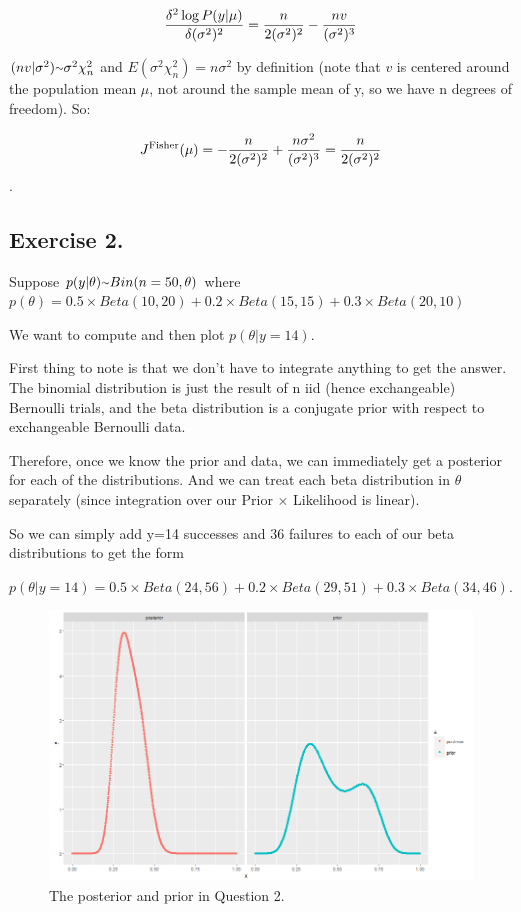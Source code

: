 \documentclass{article}
\newcommand{\mytilde}{\raise.17ex\hbox{$\scriptstyle\mathtt{\sim}$}}
\begin{document}
\[{\delta^2\log P(y\vert\mu) \over \delta(\sigma^2)^2} =  {n \over 2(\sigma^2)^2} - {nv \over (\sigma^2)^3}\]

\((nv \vert \sigma^2) \mytilde \sigma^2\chi^2_{n} \) and \(E( \sigma^2\chi^2_{n}) = n\sigma^2\) by definition (note that 
\(v\) is centered around the population mean \(\mu\), not around the sample mean of y, so we have n degrees of freedom). So:

\[J^{\text{Fisher}}(\mu) = 
-{n \over 2(\sigma^2)^2} + {n\sigma^2 \over (\sigma^2)^3} = {n \over 2(\sigma^2)^2}\].

\newpage

\subsection{Exercise 2.}

Suppose \(p(y \vert \theta) \mytilde Bin(n = 50, \theta)\) where 
\(p(\theta) = 0.5 \times Beta(10, 20) + 0.2 \times Beta(15,15) + 0.3 \times Beta(20,10)\)

We want to compute and then plot \(p(\theta \vert y=14)\).

First thing to note is that we don't have to integrate anything
to get the answer. The binomial distribution is just
the result of n iid (hence exchangeable) Bernoulli trials, and
the beta distribution is a conjugate prior with respect to
exchangeable Bernoulli data.

Therefore, once we know the prior and data, we can immediately get a posterior
for each of the distributions. And we can treat each beta distribution in \(\theta\) separately 
(since integration over our Prior \(\times\) Likelihood is linear).

So we can simply add y=14 successes and 36 failures to each of our 
beta distributions to get the form 

\(p(\theta \vert y = 14) = 0.5 \times Beta(24, 56) + 0.2 \times Beta(29, 51) + 0.3 \times Beta (34, 46)\).

\begin{figure}[!ht]
  \caption{The posterior and prior in Question 2.}
  \centering
    \includegraphics[width=\textwidth]{Question2}
\end{figure}
\end{document}
